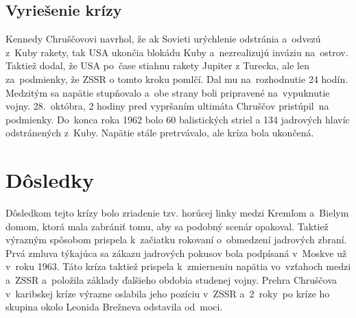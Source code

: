\documentclass[a4paper]{article}
\begin{document}
\subsection{ Vyriešenie krízy}
Kennedy Chruščovovi navrhol, že ak Sovieti urýchlenie odstránia a~odvezú z~Kuby rakety, tak USA ukončia blokádu Kuby a~nezrealizujú inváziu na~ostrov. Taktiež dodal, že USA po~čase stiahnu rakety Jupiter z Turecka, ale len za~podmienky, že ZSSR o tomto kroku pomlčí. Dal mu na~rozhodnutie 24 hodín. Medzitým sa napätie stupňovalo a~obe strany boli pripravené na~vypuknutie vojny. 28.~októbra, 2 hodiny pred vypršaním ultimáta Chruščov pristúpil~na 
podmienky. Do~konca roka 1962 bolo 60 balistických striel a 134 jadrových hlavíc odstránených z~Kuby. Napätie stále pretrvávalo, ale kríza bola ukončená.

\section{ Dôsledky}
Dôsledkom tejto krízy bolo zriadenie tzv. horúcej linky medzi Kremľom a~Bielym domom, ktorá mala zabrániť tomu, aby sa podobný scenár opakoval. Taktiež výrazným spôsobom prispela k~začiatku rokovaní o~obmedzení jadrových zbraní. Prvá zmluva týkajúca 
sa zákazu jadrových pokusov bola podpísaná v~Moskve už v~roku 1963. Táto kríza taktiež prispela k~zmierneniu napätia vo~vzťahoch medzi a~ZSSR a~položila základy ďalšieho obdobia studenej vojny. Prehra Chruščova v~karibskej kríze výrazne oslabila jeho pozíciu v~ZSSR a~2~roky~po kríze ho skupina okolo Leonida Brežneva odstavila od~moci.
\end{document}

